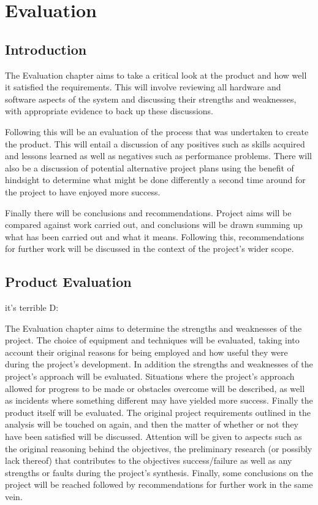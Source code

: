\part{Evaluation}
	\chapter{Introduction}
	The Evaluation chapter aims to take a critical look at the product and how well it satisfied the requirements. This will involve reviewing all hardware and software aspects of the system and discussing their strengths and weaknesses, with appropriate evidence to back up these discussions. 
	
	Following this will be an evaluation of the process that was undertaken to create the product. This will entail a discussion of any positives such as skills acquired and lessons learned as well as negatives such as performance problems. There will also be a discussion of potential alternative project plans using the benefit of hindsight to determine what might be done differently a second time around for the project to have enjoyed more success.
	
	Finally there will be conclusions and recommendations. Project aims will be compared against work carried out, and conclusions will be drawn summing up what has been carried out and what it means. Following this, recommendations for further work will be discussed in the context of the project's wider scope.
	
	\chapter{Product Evaluation}
	it's terrible 
	D:
	
	The Evaluation chapter aims to determine the strengths and weaknesses of the project. The choice of equipment and techniques will be evaluated, taking into account their original reasons for being employed and how useful they were during the project's development. In addition the strengths and weaknesses of the project's approach will be evaluated. Situations where the project's approach allowed for progress to be made or obstacles overcome will be described, as well as incidents where something different may have yielded more success. Finally the product itself will be evaluated. The original project requirements outlined in the analysis will be touched on again, and then the matter of whether or not they have been satisfied will be discussed. Attention will be given to aspects such as the original reasoning behind the objectives, the preliminary research (or possibly lack thereof) that contributes to the objectives success/failure as well as any strengths or faults during the project's synthesis. Finally, some conclusions on the project will be reached followed by recommendations for further work in the same vein. 
	
